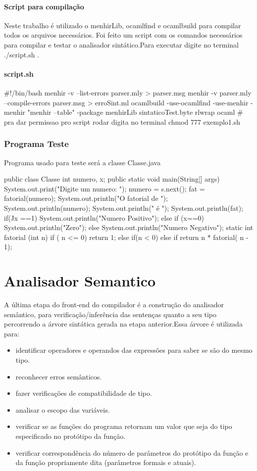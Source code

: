 \documentclass[12pt,a4paper,twoside]{report}
\begin{document}
\subsubsection{Script para compilação}
 Neste trabalho é utilizado o menhirLib, ocamlfind e ocamlbuild para compilar todos os arquivos necessários.
Foi feito um script com os comandos necessários para compilar e testar o analisador sintático.Para executar digite no terminal ./script.sh .
\subsubsection{script.sh}
\begin{terminal}
#!/bin/bash
menhir -v --list-errors parser.mly > parser.msg
menhir -v parser.mly --compile-errors parser.msg > erroSint.ml
ocamlbuild -use-ocamlfind -use-menhir -menhir "menhir --table" -package menhirLib sintaticoTest.byte
rlwrap ocaml
# pra dar permissao pro script rodar digita no terminal chmod 777 exemplo1.sh
\end{terminal}
\subsection{Programa Teste}
Programa usado para teste será a classe Classe.java
\begin{terminal}
public class Classe
{
int numero, x;
public static void main(String[] args)
{
System.out.print("Digite um numero: ");
numero = s.next();
fat = fatorial(numero);
System.out.println("O fatorial de ");
System.out.println(numero);
System.out.println(" é ");
System.out.println(fat);
if(Jx ==1) System.out.println("Numero Positivo");
else if (x==0) System.out.println("Zero");
else System.out.println("Numero Negativo");
}
    static int fatorial (int n){
if ( n <= 0) 
return 1;
else if(n < 0){} else if
return n * fatorial( n - 1);
}
}
\end{terminal}
\chapter{Analisador Semantico}
A última etapa do front-end do compilador é a construção do analisador semântico, para verificação/inferência das sentenças quanto a seu tipo percorrendo a árvore sintática gerada na etapa anterior.Essa árvore é utilizada para:
\begin{itemize}
\item identificar operadores e operandos das expressões para saber se são do mesmo tipo.
\item reconhecer erros semânticos.
\item fazer verificações de compatibilidade de tipo.
\item analisar o escopo das variáveis.
\item verificar se as funções do programa retornam um valor que seja do tipo especificado no protótipo da função.
\item verificar correspondência do número de parâmetros do protótipo da função e da função propriamente dita (parâmetros formais e atuais).
\end{itemize}
\end{document}
